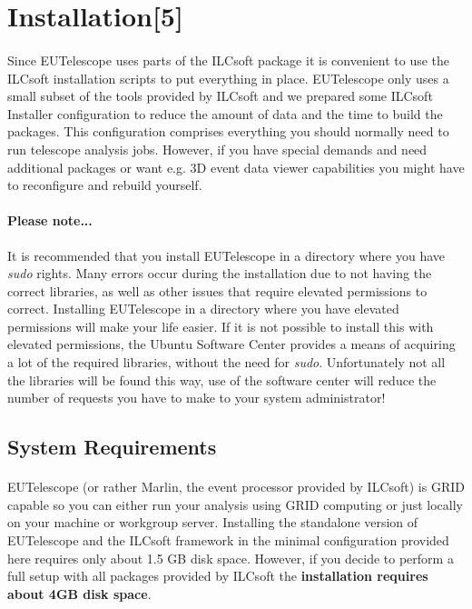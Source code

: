 \documentclass[11pt]{article}
\begin{document}
\section{Installation[5]}
\paragraph{}
Since EUTelescope uses parts of the ILCsoft package it is convenient to use the ILCsoft installation scripts to put everything in place. EUTelescope only uses a small subset of the tools provided by ILCsoft and we prepared some ILCsoft Installer configuration to reduce the amount of data and the time to build the packages. This configuration comprises everything you should normally need to run telescope analysis jobs. However, if you have special demands and need additional packages or want e.g. 3D event data viewer capabilities you might have to reconfigure and rebuild yourself.
\paragraph{Please note...}
It is recommended that you install EUTelescope in a directory where you have \textit{sudo} rights. Many errors occur during the installation due to not having the correct libraries, as well as other issues that require elevated permissions to correct. Installing EUTelescope in a directory where you have elevated permissions will make your life easier. If it is not possible to install this with elevated permissions, the Ubuntu Software Center provides a means of acquiring a lot of the required libraries, without the need for \textit{sudo}. Unfortunately not all the libraries will be found this way, use of the software center will reduce the number of requests you have to make to your system administrator!
\subsection{System Requirements}
\paragraph{}
EUTelescope (or rather Marlin, the event processor provided by ILCsoft) is GRID capable so you can either run your analysis using GRID computing or just locally on your machine or workgroup server. Installing the standalone version of EUTelescope and the ILCsoft framework in the minimal configuration provided here requires only about 1.5 GB disk space. However, if you decide to perform a full setup with all packages provided by ILCsoft the \textbf{installation requires about 4GB disk space}.
\end{document}
